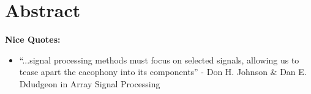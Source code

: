\section*{Abstract}

\textbf{Nice Quotes:
}\begin{itemize}
	\item ``...signal processing methods must focus on selected signals, allowing us to tease apart the cacophony into its components'' - Don H. Johnson \& Dan E. Ddudgeon in Array Signal Processing
\end{itemize}

\todo[inline]{}

